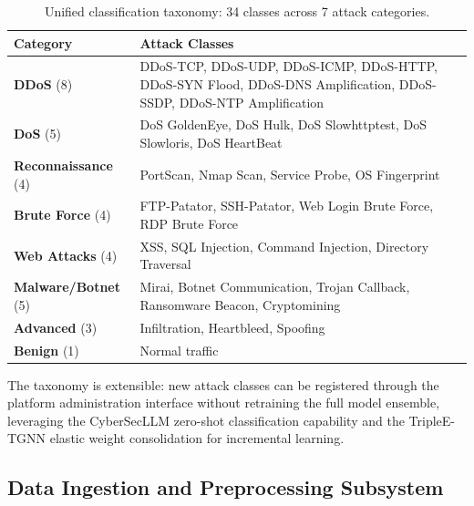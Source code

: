 \begin{table}[htbp]\centering\small
\caption{Unified classification taxonomy: 34 classes across 7 attack categories.}
\label{tab:taxonomy}
\small
\renewcommand{\arraystretch}{0.92}\begin{tabular}{p{2.5cm} p{10.5cm}}
\toprule
\textbf{Category} & \textbf{Attack Classes} \\
\midrule
\textbf{DDoS} (8) & DDoS-TCP, DDoS-UDP, DDoS-ICMP, DDoS-HTTP, DDoS-SYN Flood, DDoS-DNS Amplification, DDoS-SSDP, DDoS-NTP Amplification \\
\addlinespace
\textbf{DoS} (5) & DoS GoldenEye, DoS Hulk, DoS Slowhttptest, DoS Slowloris, DoS HeartBeat \\
\addlinespace
\textbf{Reconnaissance} (4) & PortScan, Nmap Scan, Service Probe, OS Fingerprint \\
\addlinespace
\textbf{Brute Force} (4) & FTP-Patator, SSH-Patator, Web Login Brute Force, RDP Brute Force \\
\addlinespace
\textbf{Web Attacks} (4) & XSS, SQL Injection, Command Injection, Directory Traversal \\
\addlinespace
\textbf{Malware/Botnet} (5) & Mirai, Botnet Communication, Trojan Callback, Ransomware Beacon, Cryptomining \\
\addlinespace
\textbf{Advanced} (3) & Infiltration, Heartbleed, Spoofing \\
\addlinespace
\textbf{Benign} (1) & Normal traffic \\
\bottomrule
\end{tabular}
\end{table}

The taxonomy is extensible: new attack classes can be registered through the platform administration interface without retraining the full model ensemble, leveraging the CyberSecLLM zero-shot classification capability and the TripleE-TGNN elastic weight consolidation for incremental learning.

\subsection{Data Ingestion and Preprocessing Subsystem}
\label{subsec:func_ingestion}

